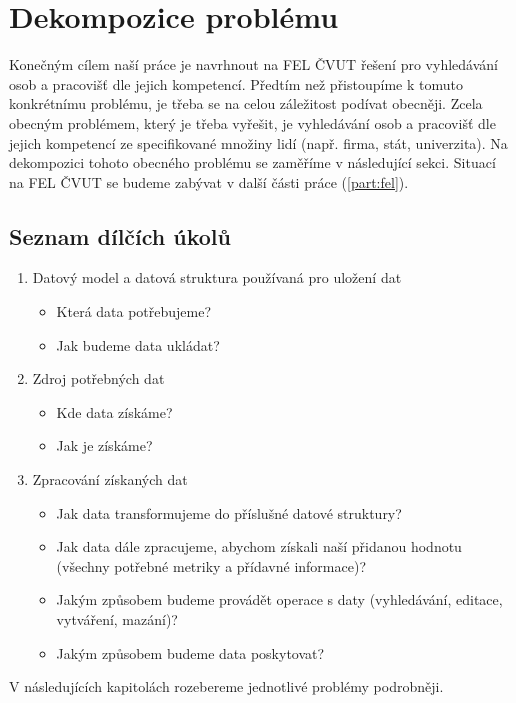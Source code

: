 \chapter{Dekompozice problému} \label{chap:decompisition} %
Konečným cílem naší práce je navrhnout na FEL ČVUT řešení pro vyhledávání osob a pracovišť dle jejich kompetencí. Předtím než přistoupíme k tomuto konkrétnímu problému, je třeba se na celou záležitost podívat obecněji. Zcela obecným problémem, který je třeba vyřešit, je vyhledávání osob a pracovišť dle jejich kompetencí ze specifikované množiny lidí (např. firma, stát, univerzita). Na dekompozici tohoto obecného problému se zaměříme v následující sekci. Situací na FEL ČVUT se budeme zabývat v další části práce (\ref{part:fel}).\par
\section{Seznam dílčích úkolů}
\begin{enumerate}
\item Datový model a datová struktura používaná pro uložení dat
\begin{itemize}
\item Která data potřebujeme?
\item Jak budeme data ukládat?
\end{itemize}
\item Zdroj potřebných dat
\begin{itemize}
\item Kde data získáme?
\item Jak je získáme?
\end{itemize}
\item Zpracování získaných dat
\begin{itemize}
\item Jak data transformujeme do příslušné datové struktury?
\item Jak data dále zpracujeme, abychom získali naší přidanou hodnotu (všechny potřebné metriky a přídavné informace)?
\item Jakým způsobem budeme provádět operace s daty (vyhledávání, editace, vytváření, mazání)?
\item Jakým způsobem budeme data poskytovat?
\end{itemize}
\end{enumerate}
V následujících kapitolách rozebereme jednotlivé problémy podrobněji.

